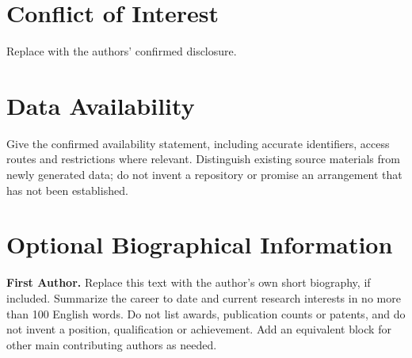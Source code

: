 \documentclass[a4paper,11pt]{article}
\begin{document}
\section*{Conflict of Interest}
Replace with the authors' confirmed disclosure.

\section*{Data Availability}
Give the confirmed availability statement, including accurate identifiers,
access routes and restrictions where relevant. Distinguish existing source
materials from newly generated data; do not invent a repository or promise
an arrangement that has not been established.




\section*{Optional Biographical Information}
\noindent
\begin{minipage}[t]{0.22\linewidth}
\vspace{0pt}\centering
{}
\end{minipage}\hfill
\begin{minipage}[t]{0.74\linewidth}
\vspace{0pt}\textbf{First Author.} Replace this text with the author's own
short biography, if included. Summarize the career to date and current
research interests in no more than 100 English words. Do not list awards,
publication counts or patents, and do not invent a position, qualification
or achievement. Add an equivalent block for other main contributing
authors as needed.
\end{minipage}
\par

\clearpage
\end{document}
